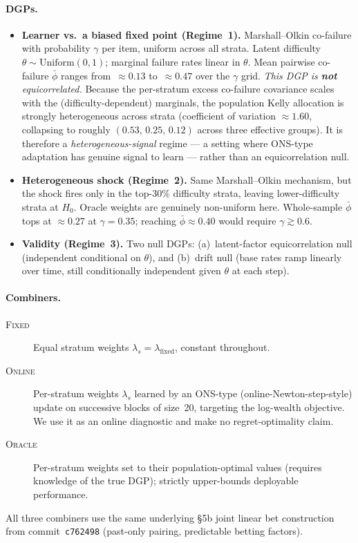 \documentclass[11pt]{article}
\begin{document}
\paragraph{DGPs.}
\begin{itemize}
  \item \textbf{Learner vs.\ a biased fixed point (Regime~1).} Marshall--Olkin
    co-failure with probability $\gamma$ per item, uniform across all strata.
    Latent difficulty $\theta\sim\mathrm{Uniform}(0,1)$; marginal failure rates
    linear in $\theta$.
    Mean pairwise co-failure $\bar\phi$ ranges from~$\approx 0.13$ to~$\approx 0.47$
    over the $\gamma$ grid.
    \emph{This DGP is \textbf{not} equicorrelated.} Because the per-stratum excess
    co-failure covariance scales with the (difficulty-dependent) marginals, the
    population Kelly allocation is strongly heterogeneous across strata
    (coefficient of variation $\approx 1.60$, collapsing to roughly
    $(0.53,\,0.25,\,0.12)$ across three effective groups). It is therefore a
    \emph{heterogeneous-signal} regime --- a setting where ONS-type adaptation has
    genuine signal to learn --- rather than an equicorrelation null.

  \item \textbf{Heterogeneous shock (Regime~2).} Same Marshall--Olkin mechanism, but
    the shock fires only in the top-$30\%$ difficulty strata, leaving lower-difficulty
    strata at $H_0$.  Oracle weights are genuinely non-uniform here.
    Whole-sample $\bar\phi$ tops at $\approx 0.27$ at $\gamma=0.35$; reaching
    $\bar\phi\approx 0.40$ would require $\gamma\gtrsim 0.6$.

  \item \textbf{Validity (Regime~3).} Two null DGPs: (a)~latent-factor
    equicorrelation null (independent conditional on $\theta$), and
    (b)~drift null (base rates ramp linearly over time, still conditionally
    independent given $\theta$ at each step).
\end{itemize}

\paragraph{Combiners.}
\begin{description}
  \item[\textsc{Fixed}] Equal stratum weights $\lambda_s = \lambda_{\mathrm{fixed}}$,
    constant throughout.
  \item[\textsc{Online}] Per-stratum weights $\lambda_s$ learned by an ONS-type
    (online-Newton-step-style) update on successive blocks of size~20, targeting the
    log-wealth objective. We use it as an online diagnostic and make no
    regret-optimality claim.
  \item[\textsc{Oracle}] Per-stratum weights set to their population-optimal values
    (requires knowledge of the true DGP); strictly upper-bounds deployable performance.
\end{description}
All three combiners use the same underlying \S5b joint linear bet construction from
commit~\texttt{c762498} (past-only pairing, predictable betting factors).
\end{document}
